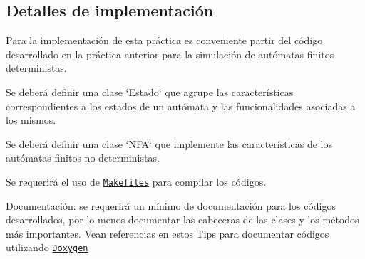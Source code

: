 \subsection*{Detalles de implementación}


\begin{DoxyItemize}
\item Para la implementación de esta práctica es conveniente partir del código desarrollado en la práctica anterior para la simulación de autómatas finitos deterministas.
\item Se deberá definir una clase \char`\"{}\+Estado\char`\"{} que agrupe las características correspondientes a los estados de un autómata y las funcionalidades asociadas a los mismos.
\item Se deberá definir una clase \char`\"{}\+N\+F\+A\char`\"{} que implemente las características de los autómatas finitos no deterministas.
\item Se requerirá el uso de \href{https://stackoverflow.com/questions/2481269/how-to-make-a-simple-c-makefile}{\tt Makefiles} para compilar los códigos.
\item Documentación\+: se requerirá un mínimo de documentación para los códigos desarrollados, por lo menos documentar las cabeceras de las clases y los métodos más importantes. Vean referencias en estos Tips para documentar códigos utilizando \href{http://www.stack.nl/~dimitri/doxygen/}{\tt Doxygen} 
\end{DoxyItemize}